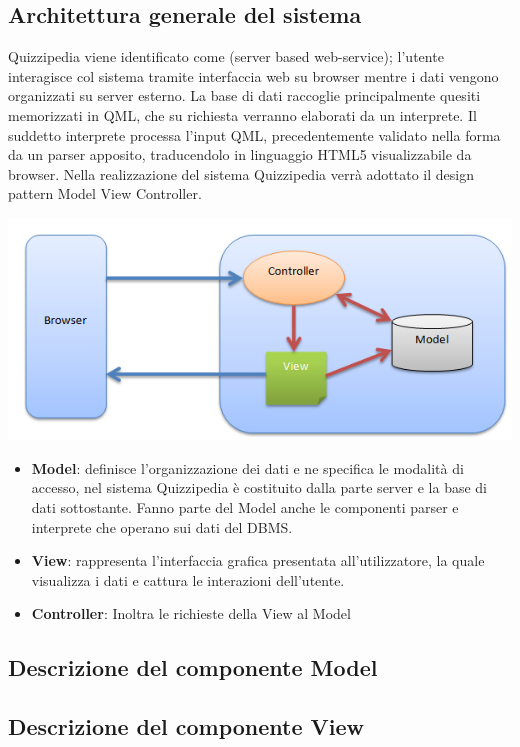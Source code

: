 \documentclass[a4paper,11pt]{article}
\begin{document}
	\subsection{Architettura generale del sistema}
	Quizzipedia viene identificato come (server based web-service); l'utente interagisce col sistema tramite interfaccia web su browser mentre i dati vengono organizzati su server esterno. La base di dati raccoglie principalmente quesiti memorizzati in QML, che su richiesta verranno elaborati da un interprete.
Il suddetto interprete processa l'input QML, precedentemente validato nella forma da un parser apposito, traducendolo in linguaggio HTML5 visualizzabile da browser.
Nella realizzazione del sistema Quizzipedia verrà adottato il design pattern Model View Controller.
\begin{center}
	\includegraphics[scale=0.6]{../images/mvc.PNG}
\end{center}
\begin {itemize}
\item\textbf{Model}: definisce l'organizzazione dei dati e ne specifica le modalità di accesso, nel sistema Quizzipedia è costituito dalla parte server e la base di dati sottostante. Fanno parte del Model anche le componenti parser e interprete che operano sui dati del DBMS.
\item\textbf{View}: rappresenta l'interfaccia grafica presentata all'utilizzatore, la quale visualizza i dati e cattura le interazioni dell'utente.
\item\textbf{Controller}: Inoltra le richieste della View al Model
	\end {itemize}
	\subsection{Descrizione del componente Model}
	\subsection{Descrizione del componente View}	
\end{document}
